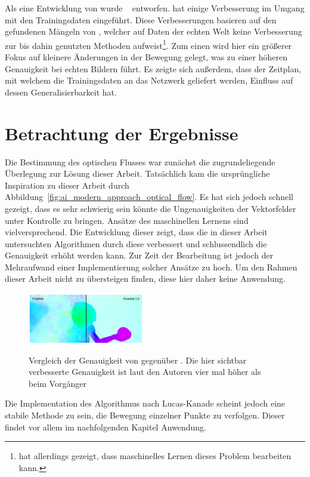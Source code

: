 Als eine Entwicklung von  wurde ~\cite{Ilg2016} entworfen.
 hat einige Verbesserung im Umgang mit den Trainingsdaten eingeführt.
Diese Verbesserungen basieren auf den gefundenen Mängeln von , welcher auf Daten der echten Welt keine Verbesserung zur bis dahin genutzten Methoden aufweist\footnote{ hat allerdings gezeigt, dass maschinelles Lernen dieses Problem bearbeiten kann.}.
Zum einen wird hier ein grö{\ss}erer Fokus auf kleinere Änderungen in der Bewegung gelegt, was zu einer höheren Genauigkeit bei echten Bildern führt.
Es zeigte sich au{\ss}erdem, dass der Zeitplan, mit welchem die Trainingsdaten an das Netzwerk geliefert werden, Einfluss auf dessen Generalisierbarkeit hat.

\section{Betrachtung der Ergebnisse}

Die Bestimmung des optischen Flusses war zunächst die zugrundeliegende Überlegung zur Lösung dieser Arbeit.
Tatsächlich kam die ursprüngliche Inspiration zu dieser Arbeit durch  Abbildung~\ref{fig:ai_modern_approach_optical_flow}.
Es hat sich jedoch schnell gezeigt, dass es sehr schwierig sein könnte die Ungenauigkeiten der Vektorfelder unter Kontrolle zu bringen.
Ansätze des maschinellen Lernens sind vielversprechend.
Die Entwicklung dieser zeigt, dass die in dieser Arbeit untersuchten Algorithmen durch diese verbessert und schlussendlich die Genauigkeit erhöht werden kann.
Zur Zeit der Bearbeitung ist jedoch der Mehraufwand einer Implementierung solcher Ansätze zu hoch.
Um den Rahmen dieser Arbeit nicht zu übersteigen finden, diese hier daher keine Anwendung.

\begin{figure}
    \centering
    \includegraphics[width=0.45\textwidth]{gfx/flownet_vs_flownet2.png}
    \label{fig:flownet_vs_flownet2}
    \caption[Vergleich  zu ]{Vergleich der Genauigkeit von  gegenüber . Die hier sichtbar verbesserte Genauigkeit ist laut den Autoren vier mal höher als beim Vorgänger~\cite{Ilg2016}}
\end{figure}

Die Implementation des Algorithmus nach Lucas-Kanade scheint jedoch eine stabile Methode zu sein, die Bewegung einzelner Punkte zu verfolgen.
Dieser findet vor allem im nachfolgenden Kapitel Anwendung.
